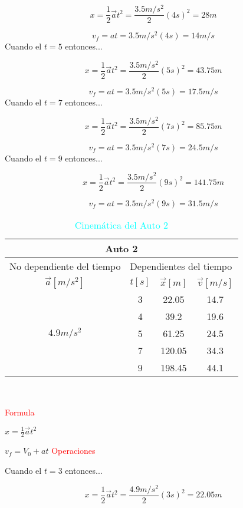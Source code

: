 \documentclass[letterpaper,12pt]{article}
\begin{document}
\begin{enumerate}
$${x}=\frac{1}{2}\Vec{a}t^{2}=\frac{3.5m/s^{2}}{2}(4s)^{2}=28m$$

$$v_f=at=3.5m/s^{2}(4s)=14m/s$$
Cuando el $t=5$ entonces...

$${x}=\frac{1}{2}\Vec{a}t^{2}=\frac{3.5m/s^{2}}{2}(5s)^{2}=43.75m$$

$$v_f=at=3.5m/s^{2}(5s)=17.5m/s$$
Cuando el $t=7$ entonces...

$${x}=\frac{1}{2}\Vec{a}t^{2}=\frac{3.5m/s^{2}}{2}(7s)^{2}=85.75m$$

$$v_f=at=3.5m/s^{2}(7s)=24.5m/s$$
Cuando el $t=9$ entonces...

$${x}=\frac{1}{2}\Vec{a}t^{2}=\frac{3.5m/s^{2}}{2}(9s)^{2}=141.75m$$

$$v_f=at=3.5m/s^{2}(9s)=31.5m/s$$
  \begin{table}[h]
        \centering
            \begin{tabular}{|c|c|c|c|c|c|}\hline \hline
                \multicolumn{6}{|c|}{Auto 2}\\\hline
                \multicolumn{3}{|l|}{No dependiente del tiempo} & \multicolumn{3}{|l|}{Dependientes del tiempo}\\\hline
                \multicolumn{3}{|c|}{$\vec{a}[m/s^{2}]$} & {$t[s]$} & {$\vec{x}[m]$} & {$\vec{v}[m/s]$}\\\hline
                \multicolumn{3}{|c|}{} &3 &22.05  &14.7 \\\cline{4-6}
                \multicolumn{3}{|c|}{} &4  &39.2  &19.6 \\\cline{4-6}
                \multicolumn{3}{|c|}{$4.9m/s^{2}$} &5  &61.25  &24.5 \\\cline{4-6}
                \multicolumn{3}{|c|}{} &7  &120.05  &34.3 \\\cline{4-6}
                \multicolumn{3}{|c|}{} &9  &198.45  &44.1 \\\hline \hline
            \end{tabular}\\
        \caption{\textcolor{cyan}{Cinemática del Auto 2}}
        \label{Cuadro 1: Cinemática del Auto 1}
        \end{table} 
{\textcolor{red}{Formula}}

${x}=\frac{1}{2}\Vec{a}t^{2}$

$v_f=V_0+at$
{\textcolor{red}{Operaciones}}

Cuando el $t=3$ entonces...

$${x}=\frac{1}{2}\Vec{a}t^{2}=\frac{4.9m/s^{2}}{2}(3s)^{2}=22.05m$$


\end{enumerate}
\end{document}
